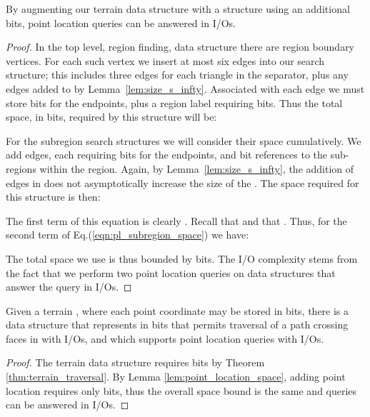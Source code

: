 \begin{lemma}\label{lem:point_location_space}
By augmenting our terrain data structure with a structure using an additional 
 bits, point location queries can be answered in 
 I/Os.
\end{lemma}

\begin{proof}
In the top level, region finding, data structure there are 
 region boundary vertices. 
For each such vertex we insert at most six edges into our search structure;
this includes three edges for each triangle in the separator, plus any edges
added to  by Lemma~\ref{lem:size_s_infty}.
Associated with each edge we must store  bits for the endpoints, 
plus a region label requiring  
bits. 
Thus the total space, in bits, required by this structure will be:



For the subregion search structures we will consider their space cumulatively.
We add  edges, each requiring  bits 
for the endpoints,
and  bit references to the  sub-regions within the region. 
Again, by Lemma~\ref{lem:size_s_infty}, the addition of edges in  does not 
asymptotically increase the size of the .
The space required for this structure is then:



The first term of this equation is clearly . 
Recall that  and that . 
Thus, for the second term of Eq.(\ref{eqn:pl_subregion_space}) we have:

 

The total space we use is thus bounded by  bits. 
The I/O complexity stems from the fact that we perform two point location 
queries on data structures that answer the query in  I/Os.
\end{proof}

\begin{theorem}\label{thm:terrain_with_point_location}
Given a terrain , where each point coordinate may be stored in  
bits, there is a data structure that represents  in 
 bits that permits traversal of a path crossing 
 faces in  with  I/Os, and which 
supports point location queries with  I/Os.
\end{theorem} 

\begin{proof}
The terrain data structure requires  bits by 
Theorem \ref{thm:terrain_traversal}. 
By Lemma \ref{lem:point_location_space}, adding point location requires only 
 bits, thus the overall space bound is the same and queries 
can be answered in  I/Os.
\end{proof}


